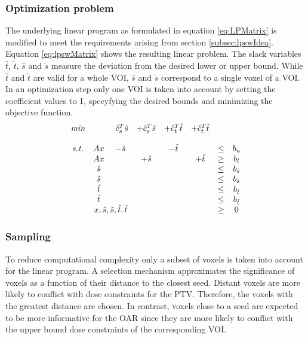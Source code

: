 \documentclass[12pt]{article}
\begin{document}
	\subsubsection{Optimization problem}
		The underlying linear program as formulated in equation \ref{eq:LPMatrix} is modified to meet the requirements arising from section \ref{subsec:lpswIdea}. Equation \ref{eq:lpswMatrix} shows the resulting linear problem. The slack variables $\hat{t}$, $\check{t}$, $\hat{s}$ and $\check{s}$ measure the deviation from the desired lower or upper bound. While $\hat{t}$ and $\check{t}$ are valid for a whole VOI, $\hat{s}$ and $\check{s}$ correspond to a single voxel of a VOI. In an optimization step only one VOI is taken into account by setting the coefficient values to 1, specyfying the desired bounds and minimizing the objective function.
		\begin{equation}
			\label{eq:lpswMatrix}
			\begin{matrix}
			\textit{min} &            & ~\hat{c}_s^T\hat{s} & +\check{c}_s^T\check{s}    & +\hat{c}_t^T\hat{t} & +\check{c}_t^T\check{t} & & \\\\
			\textit{s.t.} & Ax         & -\hat{s}            &            & -\hat{t}  &            & \leq & b_u\\
     & Ax         & 		            & +\check{s} &           & +\check{t} & \geq & b_l\\
			   	 & \hat{s}    & 		            &            &           &            & \leq & b_{\hat{s}}\\
          & \check{s}  & 	                &            &           &            & \leq & b_{\check{s}}\\
          & \hat{t}    & 		            &            &           &            & \leq & b_{\hat{t}}\\
          & \check{t}  & 	                &            &           &            & \leq & b_{\check{t}}\\
				 & \multicolumn{2}{c}{x,\hat{s},\check{s},\hat{t},\check{t}} & & & & \geq & 0
			\end{matrix}		
		\end{equation}
	
	\subsubsection{Sampling}
		To reduce computational complexity only a subset of voxels is taken into account for the linear program. A selection mechanism approximates the significance of voxels as a function of their distance to the closest seed. Distant voxels are more likely to conflict with dose constraints for the PTV. Therefore, the voxels with the greatest distance are chosen. In contrast, voxels close to a seed are expected to be more informative for the OAR since they are more likely to conflict with the upper bound dose constraints of the corresponding VOI.
	
\end{document}

